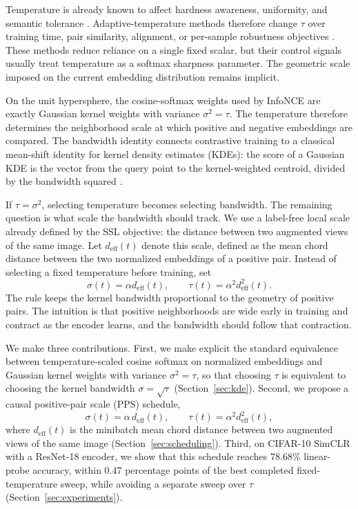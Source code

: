 \documentclass{article}
\begin{document}
Temperature is already known to affect hardness awareness, uniformity, and semantic tolerance \citep{wang2020understanding,wang2021understanding,kukleva2023temperature}. Adaptive-temperature methods therefore change $\tau$ over training time, pair similarity, alignment, or per-sample robustness objectives \citep{manna2024dystress,qiu2023not,huang2023model,khaertdinov2022dynamic,wang2024adaptive}. These methods reduce reliance on a single fixed scalar, but their control signals usually treat temperature as a softmax sharpness parameter. The geometric scale imposed on the current embedding distribution remains implicit.

On the unit hypersphere, the cosine-softmax weights used by InfoNCE are exactly Gaussian kernel weights with variance $\sigma^2=\tau$. The temperature therefore determines the neighborhood scale at which positive and negative embeddings are compared. The bandwidth identity connects contrastive training to a classical mean-shift identity for kernel density estimates (KDEs): the score of a Gaussian KDE is the vector from the query point to the kernel-weighted centroid, divided by the bandwidth squared \citep{fukunaga1975estimation,comaniciu2002mean}.

If $\tau=\sigma^2$, selecting temperature becomes selecting bandwidth. The remaining question is what scale the bandwidth should track. We use a label-free local scale already defined by the SSL objective: the distance between two augmented views of the same image. Let $d_{\mathrm{eff}}(t)$ denote this scale, defined as the mean chord distance between the two normalized embeddings of a positive pair. Instead of selecting a fixed temperature before training, set
\begin{equation}
\sigma(t)=\alpha d_{\mathrm{eff}}(t),
\qquad
\tau(t)=\alpha^2 d_{\mathrm{eff}}^2(t).
\label{eq:simple-schedule}
\end{equation}
The rule keeps the kernel bandwidth proportional to the geometry of positive pairs. The intuition is that positive neighborhoods are wide early in training and contract as the encoder learns, and the bandwidth should follow that contraction.

We make three contributions. First, we make explicit the standard equivalence between temperature-scaled cosine softmax on normalized embeddings and Gaussian kernel weights with variance $\sigma^2=\tau$, so that choosing $\tau$ is equivalent to choosing the kernel bandwidth $\sigma=\sqrt{\tau}$ (Section~\ref{sec:kde}). Second, we propose a causal positive-pair scale (PPS) schedule,
\begin{equation*}
\sigma(t)=\alpha\, d_{\mathrm{eff}}(t), \qquad \tau(t)=\alpha^2 d_{\mathrm{eff}}^2(t),
\end{equation*}
where $d_{\mathrm{eff}}(t)$ is the minibatch mean chord distance between two augmented views of the same image (Section~\ref{sec:scheduling}). Third, on CIFAR-10 SimCLR with a ResNet-18 encoder, we show that this schedule reaches 78.68\% linear-probe accuracy, within 0.47 percentage points of the best completed fixed-temperature sweep, while avoiding a separate sweep over $\tau$ (Section~\ref{sec:experiments}).
\end{document}
